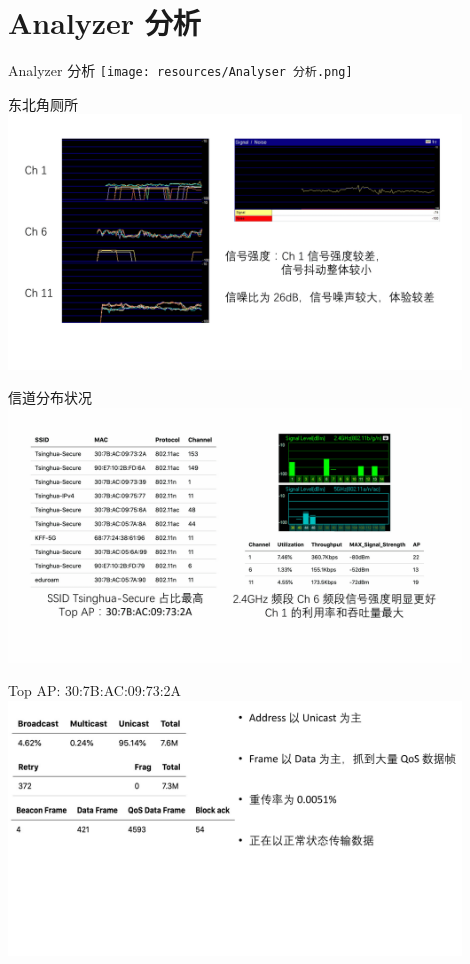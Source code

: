 \documentclass[aspectratio=169]{beamer}
\begin{document}
    \section{Analyzer 分析}
    \begin{frame}{Analyzer 分析}
      \texttt{[image: resources/Analyser 分析.png]}
    \end{frame}

    \begin{frame}{东北角厕所}
      \includegraphics[width=0.9\textwidth]{resources/东北角厕所.png}
    \end{frame}


    \begin{frame}{信道分布状况}
      \includegraphics[width=0.9\textwidth]{resources/信道分布情况.png}
    \end{frame}

    \begin{frame}{Top AP: 30:7B:AC:09:73:2A}
      \includegraphics[width=0.9\textwidth]{resources/top AP.png}
    \end{frame}
\end{document}
